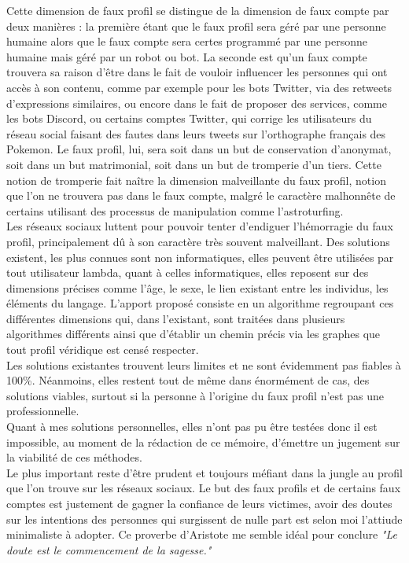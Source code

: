 \documentclass[12pt]{report}
\begin{document}
Cette dimension de faux profil se distingue de la dimension de faux compte par deux manières : la première étant que le faux profil sera géré par une personne humaine alors que le faux compte sera certes programmé par une personne humaine mais géré par un robot ou bot. La seconde est qu'un faux compte trouvera sa raison d'être dans le fait de vouloir influencer les personnes qui ont accès à son contenu, comme par exemple pour les bots Twitter, via des retweets d'expressions similaires, ou encore dans le fait de proposer des services, comme les bots Discord, ou certains comptes Twitter, qui corrige les utilisateurs du réseau social faisant des fautes dans leurs tweets sur l'orthographe français des Pokemon. Le faux profil, lui, sera soit dans un but de conservation d'anonymat, soit dans un but matrimonial, soit dans un but de tromperie d'un tiers. Cette notion de tromperie fait naître la dimension malveillante du faux profil, notion que l'on ne trouvera pas dans le faux compte, malgré le caractère malhonnête de certains utilisant des processus de manipulation comme l'astroturfing.\\

Les réseaux sociaux luttent pour pouvoir tenter d'endiguer l'hémorragie du faux profil, principalement dû à son caractère très souvent malveillant. Des solutions existent, les plus connues sont non informatiques, elles peuvent être utilisées par tout utilisateur lambda, quant à celles informatiques, elles reposent sur des dimensions précises comme l'âge, le sexe, le lien existant entre les individus, les éléments du langage. L'apport proposé consiste en un algorithme regroupant ces différentes dimensions qui, dans l'existant, sont traitées dans plusieurs algorithmes différents ainsi que d'établir un chemin précis via les graphes que tout profil véridique est censé respecter.\\

Les solutions existantes trouvent leurs limites et ne sont évidemment pas fiables à 100\%. Néanmoins, elles restent tout de même dans énormément de cas, des solutions viables, surtout si la personne à l'origine du faux profil n'est pas une professionnelle.\\
Quant à mes solutions personnelles, elles n'ont pas pu être testées donc il est impossible, au moment de la rédaction de ce mémoire, d'émettre un jugement sur la viabilité de ces méthodes. \\

Le plus important reste d'être prudent et toujours méfiant dans la jungle au profil que l'on trouve sur les réseaux sociaux. Le but des faux profils et de certains faux comptes est justement de gagner la confiance de leurs victimes, avoir des doutes sur les intentions des personnes qui surgissent de nulle part est selon moi l'attiude minimaliste à adopter. Ce proverbe d'Aristote me semble idéal pour conclure \textit {"Le doute est le commencement de la sagesse."}

\nocite{*}
\printbibliography
\end{document}

